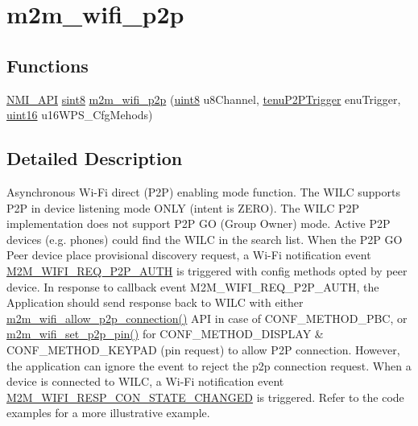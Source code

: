 \hypertarget{group__WifiP2PFn}{}\section{m2m\+\_\+wifi\+\_\+p2p}
\label{group__WifiP2PFn}
\subsection*{Functions}
\begin{DoxyCompactItemize}
\item 
\hyperlink{group__BSPDefine_gaecc0323d771e41ef81a76b5f12783e22}{N\+M\+I\+\_\+\+A\+PI} \hyperlink{group__DataT_gae35f10ffd0ac8dd2bc3e794da9bdfbc7}{sint8} \hyperlink{group__WifiP2PFn_ga9d2daba93e1e2e33bde42edd359eb2f2}{m2m\+\_\+wifi\+\_\+p2p} (\hyperlink{group__DataT_ga4df709a77647e870bbf1d955b8edc9a6}{uint8} u8\+Channel, \hyperlink{group__WlanEnums_ga0b97cca65d26d6163cabcb708e5759df}{tenu\+P2\+P\+Trigger} enu\+Trigger, \hyperlink{group__DataT_ga1daa745171fc6e31d942c161422a76f9}{uint16} u16\+W\+P\+S\+\_\+\+Cfg\+Mehods)
\end{DoxyCompactItemize}


\subsection{Detailed Description}
Asynchronous Wi-\/\+Fi direct (P2P) enabling mode function. The W\+I\+LC supports P2P in device listening mode O\+N\+LY (intent is Z\+E\+RO). The W\+I\+LC P2P implementation does not support P2P GO (Group Owner) mode. Active P2P devices (e.\+g. phones) could find the W\+I\+LC in the search list. When the P2P GO Peer device place provisional discovery request, a Wi-\/\+Fi notification event \hyperlink{group__WlanEnums_gga064de09dec1d5e88ed8d075fa40f57dea4e202c60cd4154e5c0c247e0fa8c990f}{M2\+M\+\_\+\+W\+I\+F\+I\+\_\+\+R\+E\+Q\+\_\+\+P2\+P\+\_\+\+A\+U\+TH} is triggered with config methods opted by peer device. In response to callback event M2\+M\+\_\+\+W\+I\+F\+I\+\_\+\+R\+E\+Q\+\_\+\+P2\+P\+\_\+\+A\+U\+TH, the Application should send response back to W\+I\+LC with either \hyperlink{m2m__wifi_8h_a25d63ac165f19310f6ed73d115ad9155}{m2m\+\_\+wifi\+\_\+allow\+\_\+p2p\+\_\+connection()} A\+PI in case of C\+O\+N\+F\+\_\+\+M\+E\+T\+H\+O\+D\+\_\+\+P\+BC, or \hyperlink{group__WlanEnums_gac93d56dc53ba0a5a02b669c800b7ae62}{m2m\+\_\+wifi\+\_\+set\+\_\+p2p\+\_\+pin()} for C\+O\+N\+F\+\_\+\+M\+E\+T\+H\+O\+D\+\_\+\+D\+I\+S\+P\+L\+AY \& C\+O\+N\+F\+\_\+\+M\+E\+T\+H\+O\+D\+\_\+\+K\+E\+Y\+P\+AD (pin request) to allow P2P connection. However, the application can ignore the event to reject the p2p connection request. When a device is connected to W\+I\+LC, a Wi-\/\+Fi notification event \hyperlink{group__WlanEnums_gga064de09dec1d5e88ed8d075fa40f57deabb42b3025c56c51d915a1fa4abd2dbd0}{M2\+M\+\_\+\+W\+I\+F\+I\+\_\+\+R\+E\+S\+P\+\_\+\+C\+O\+N\+\_\+\+S\+T\+A\+T\+E\+\_\+\+C\+H\+A\+N\+G\+ED} is triggered. Refer to the code examples for a more illustrative example. 

